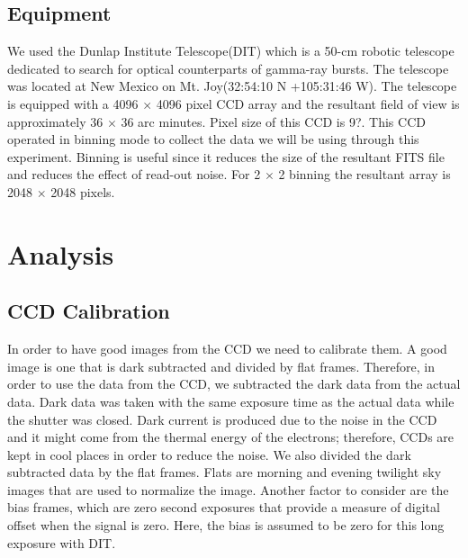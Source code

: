 \documentclass[letterpaper,12pt]{article}
\begin{document}
\subsection{Equipment}
We used the Dunlap Institute Telescope(DIT) which is a 50-cm robotic telescope dedicated to search for optical counterparts of gamma-ray bursts. The telescope was located at New Mexico on Mt. Joy(32:54:10 N +105:31:46 W). The telescope is equipped with a 4096 \begin{math}\times\end{math} 4096 pixel CCD array and the resultant field of view is approximately 36 \begin{math}\times\end{math} 36 arc minutes. Pixel size of this CCD is 9?. This CCD operated in binning mode to collect the data we will be using through this experiment. Binning is useful since it reduces the size of the resultant FITS file and reduces the effect of read-out noise. For 2 \begin{math}\times\end{math} 2 binning the resultant array is 2048 \begin{math}\times\end{math} 2048 pixels.

\section{Analysis}
\label{sec:analysis}
\subsection{CCD Calibration}
In order to have good images from the CCD we need to calibrate them. A good image is one that is dark subtracted and divided by flat frames. Therefore, in order to use the data from the CCD, we subtracted the dark data from the actual data. Dark data was taken with the same exposure time as the actual data while the shutter was closed. Dark current is produced due to the noise in the CCD and it might come from the thermal energy of the electrons; therefore, CCDs are kept in cool places in order to reduce the noise. We also divided the dark subtracted data by the flat frames. Flats are morning and evening twilight sky images that are used to normalize the image. Another factor to consider are the bias frames, which are zero second exposures that provide a measure of digital offset when the signal is zero. Here, the bias is assumed to be zero for this long exposure with DIT.
\end{document}
